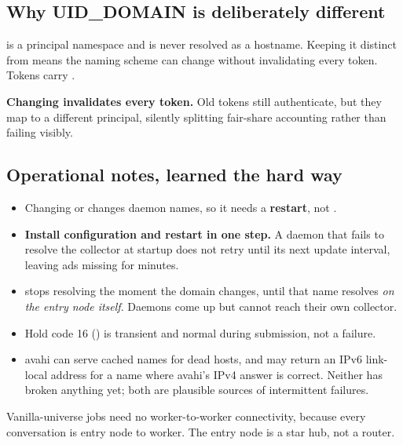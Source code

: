 \subsection{Why UID\_DOMAIN is deliberately different}

 is a principal namespace and is never resolved as a hostname.
Keeping it distinct from  means the naming scheme can
change without invalidating every token. Tokens carry
.

\begin{trap}
\textbf{Changing  invalidates every token.} Old tokens still
authenticate, but they map to a different principal, silently splitting
fair-share accounting rather than failing visibly.
\end{trap}

\subsection{Operational notes, learned the hard way}

\begin{itemize}
  \item Changing  or  changes
        daemon names, so it needs a \textbf{restart}, not .
  \item \textbf{Install configuration and restart in one step.} A daemon that
        fails to resolve the collector at startup does not retry until its next
        update interval, leaving ads missing for minutes.
  \item {} stops resolving the moment the
        domain changes, until that name resolves \emph{on the entry node itself}.
        Daemons come up but cannot reach their own collector.
  \item Hold code 16 () is transient and normal
        during  submission, not a failure.
  \item avahi can serve cached names for dead hosts, and  may return
        an IPv6 link-local address for a  name where avahi's IPv4
        answer is correct. Neither has broken anything yet; both are plausible
        sources of intermittent failures.
\end{itemize}

Vanilla-universe jobs need no worker-to-worker connectivity, because every
conversation is entry node to worker. The entry node is a star hub, not a router.

